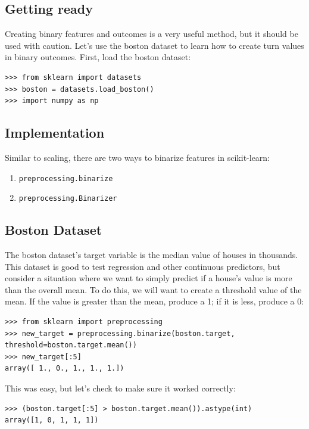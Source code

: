 \documentclass[SKL-MASTER.tex]{subfiles}
\begin{document}
\subsection*{Getting ready}
Creating binary features and outcomes is a very useful method, but it should be used with
caution. Let's use the boston dataset to learn how to create turn values in binary outcomes.
First, load the boston dataset:
\begin{framed}
\begin{verbatim}
>>> from sklearn import datasets
>>> boston = datasets.load_boston()
>>> import numpy as np
\end{verbatim}
\end{framed}
\subsection*{Implementation}
Similar to scaling, there are two ways to binarize features in scikit-learn:
\begin{enumerate}
\item \texttt{preprocessing.binarize }%
\item \texttt{preprocessing.Binarizer} %
\end{enumerate}

\subsection*{Boston Dataset}
The boston dataset's target variable is the median value of houses in thousands. This
dataset is good to test regression and other continuous predictors, but consider a situation
where we want to simply predict if a house's value is more than the overall mean. To do this,
we will want to create a threshold value of the mean. If the value is greater than the mean,
produce a 1; if it is less, produce a 0:
\begin{framed}
	\begin{verbatim}
>>> from sklearn import preprocessing
>>> new_target = preprocessing.binarize(boston.target,
threshold=boston.target.mean())
>>> new_target[:5]
array([ 1., 0., 1., 1., 1.])
\end{verbatim}
\end{framed}
This was easy, but let's check to make sure it worked correctly:
\begin{framed}
	\begin{verbatim}
>>> (boston.target[:5] > boston.target.mean()).astype(int)
array([1, 0, 1, 1, 1])
\end{verbatim}
\end{framed}
\end{document}

